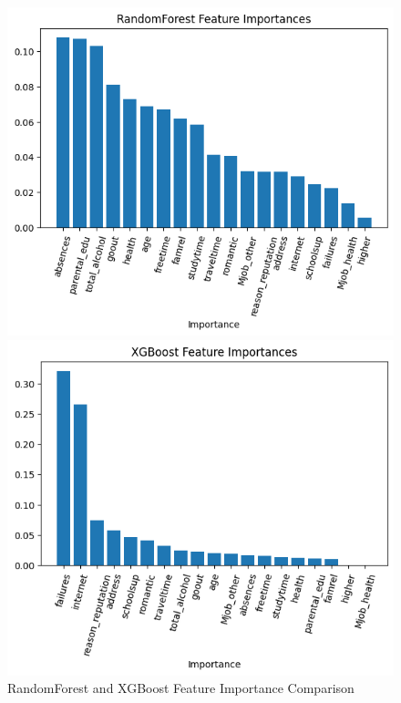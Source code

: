 \documentclass[11pt,a4paper]{article}
\begin{document}
\begin{figure}[H]
  \centering
  \begin{minipage}[b]{0.45\textwidth}
    \includegraphics[width=\textwidth]{rf_fimp.png}
  \end{minipage}
  \hfill
  \begin{minipage}[b]{0.45\textwidth}
    \includegraphics[width=\textwidth]{xgboost_fimp.png}
  \end{minipage}
  \caption{RandomForest and XGBoost Feature Importance Comparison}
\end{figure}
\end{document}
